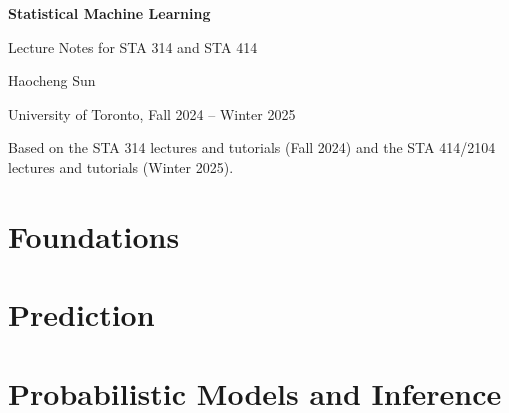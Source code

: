 \documentclass[11pt,twoside,openany]{book}
\begin{document}
\frontmatter
\begin{titlepage}
  \centering
  \vspace*{0.22\textheight}
  {\sffamily\bfseries\Huge Statistical Machine Learning\par}
  \vspace{0.8em}
  {\sffamily\Large Lecture Notes for STA 314 and STA 414\par}
  \vspace{2.5em}
  {\large Haocheng Sun\par}
  \vspace{0.6em}
  {\large University of Toronto, Fall 2024 -- Winter 2025\par}
  \vfill
  {\small Based on the STA 314 lectures and tutorials (Fall 2024) and the STA 414/2104 lectures and tutorials (Winter 2025).\par}
\end{titlepage}

\tableofcontents



\mainmatter
\part{Foundations}\label{part:foundations}




\part{Prediction}\label{part:prediction}









\part{Probabilistic Models and Inference}\label{part:probabilistic}







\end{document}
